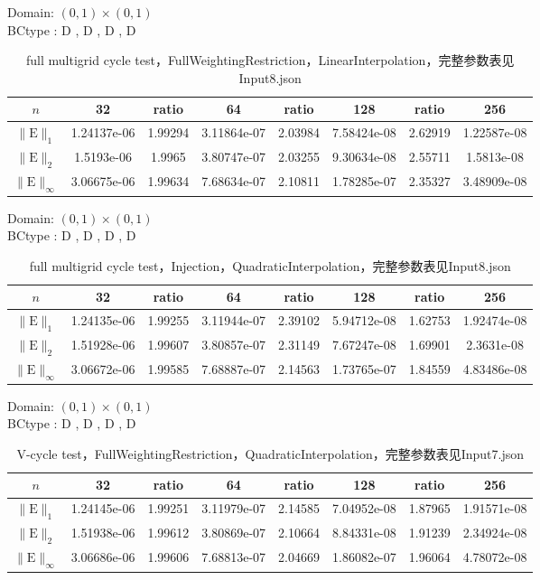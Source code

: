 \documentclass[a4paper,twoside]{ctexart}
\begin{document}
\noindent Domain: $(0,1)\times(0,1)$\\
BCtype : D , D , D , D
\begin{table}[htbp]
\centering\begin{tabular}{c|ccccccc}
\hline
$n$&32&ratio&64&ratio&128&ratio&256\\
\hline
$\|\mathrm{E}\|_1$&1.24137e-06&1.99294&3.11864e-07&2.03984&7.58424e-08&2.62919&1.22587e-08\\
\hline
$\|\mathrm{E}\|_2$&1.5193e-06&1.9965&3.80747e-07&2.03255&9.30634e-08&2.55711&1.5813e-08\\
\hline
$\|\mathrm{E}\|_{\infty}$&3.06675e-06&1.99634&7.68634e-07&2.10811&1.78285e-07&2.35327&3.48909e-08\\
\hline
\end{tabular}
\caption{full multigrid cycle test，FullWeightingRestriction，LinearInterpolation，完整参数表见Input8.json}
\end{table}

\noindent Domain: $(0,1)\times(0,1)$\\
BCtype : D , D , D , D
\begin{table}[htbp]
\centering\begin{tabular}{c|ccccccc}
\hline
$n$&32&ratio&64&ratio&128&ratio&256\\
\hline
$\|\mathrm{E}\|_1$&1.24135e-06&1.99255&3.11944e-07&2.39102&5.94712e-08&1.62753&1.92474e-08\\
\hline
$\|\mathrm{E}\|_2$&1.51928e-06&1.99607&3.80857e-07&2.31149&7.67247e-08&1.69901&2.3631e-08\\
\hline
$\|\mathrm{E}\|_{\infty}$&3.06672e-06&1.99585&7.68887e-07&2.14563&1.73765e-07&1.84559&4.83486e-08\\
\hline
\end{tabular}
\caption{full multigrid cycle test，Injection，QuadraticInterpolation，完整参数表见Input8.json}
\end{table}



\noindent Domain: $(0,1)\times(0,1)$\\
BCtype : D , D , D , D
\begin{table}[htbp]
\centering\begin{tabular}{c|ccccccc}
\hline
$n$&32&ratio&64&ratio&128&ratio&256\\
\hline
$\|\mathrm{E}\|_1$&1.24145e-06&1.99251&3.11979e-07&2.14585&7.04952e-08&1.87965&1.91571e-08\\
\hline
$\|\mathrm{E}\|_2$&1.51938e-06&1.99612&3.80869e-07&2.10664&8.84331e-08&1.91239&2.34924e-08\\
\hline
$\|\mathrm{E}\|_{\infty}$&3.06686e-06&1.99606&7.68813e-07&2.04669&1.86082e-07&1.96064&4.78072e-08\\
\hline
\end{tabular}
\caption{V-cycle test，FullWeightingRestriction，QuadraticInterpolation，完整参数表见Input7.json}
\end{table}
\end{document}
